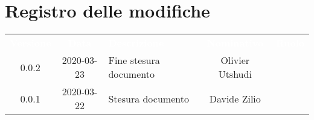 \section*{Registro delle modifiche}
{
	\centering
	\begin{longtable}{ c c  C{4cm}  c  c }
		\textcolor{white}{\textbf{Versione}} & \textcolor{white}{\textbf{Data}} & \textcolor{white}{\textbf{Descrizione}} & \textcolor{white}{\textbf{Nominativo}} & \textcolor{white}{\textbf{Ruolo}}\\		
		0.0.2 & 2020-03-23 & Fine stesura documento & Olivier Utshudi &\reda{}\\
		0.0.1 & 2020-03-22 & Stesura documento & Davide Zilio &\reda{}\\		
		
	\end{longtable}

}